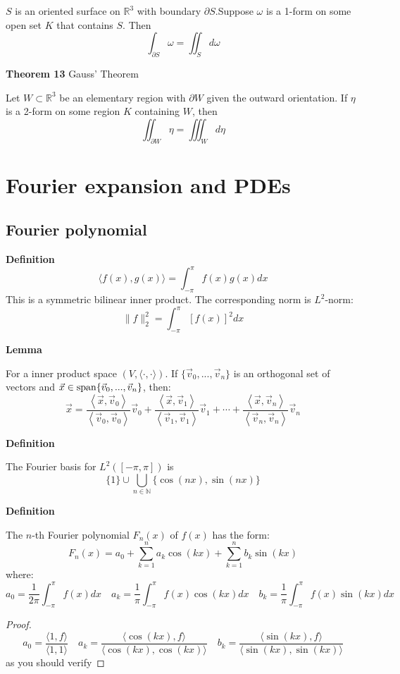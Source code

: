 \documentclass[11pt]{article}
\begin{document}
$S$ is an oriented surface on $\mathbb{R}^3$ with boundary $\partial S$.Suppose $\omega$ is a 1-form on some open set $K$ that contains $S$. Then
$$\int_{\partial S} \omega=\iint_{S} d \omega$$

\textbf{Theorem 13} Gauss' Theorem

Let $W \subset \mathbb{R}^3$ be an elementary region with $\partial W$ given the outward orientation. If $\eta$ is a 2-form on some region $K$ containing $W$, then
$$\iint_{\partial W} \eta=\iiint_{W} d \eta$$

\newpage

\section{Fourier expansion and PDEs}
\subsection{Fourier polynomial}
\textbf{Definition}
$$\langle f(x), g(x)\rangle=\int_{-\pi}^{\pi} f(x) g(x) d x$$
This is a symmetric bilinear inner product. The corresponding norm is $L^2$-norm:
$$\|f\|_{2}^{2}=\int_{-\pi}^{\pi}[f(x)]^{2} d x$$


\textbf{Lemma}

For a inner product space $(V,\langle \cdot,\cdot \rangle)$. If $\{\vec{v}_0,...,\vec{v}_n\}$ is an orthogonal set of vectors and $\vec{x}\in {\rm span}\{\vec{v}_0,...,\vec{v}_n\}$, then:
$$\vec{x}=\frac{\left\langle\vec{x}, \vec{v}_{0}\right\rangle}{\left\langle\vec{v}_{0}, \vec{v}_{0}\right\rangle} \vec{v}_{0}+\frac{\left\langle\vec{x}, \vec{v}_{1}\right\rangle}{\left\langle\vec{v}_{1}, \vec{v}_{1}\right\rangle} \vec{v}_{1}+\cdots+\frac{\left\langle\vec{x}, \vec{v}_{n}\right\rangle}{\left\langle\vec{v}_{n}, \vec{v}_{n}\right\rangle} \vec{v}_{n}$$


\textbf{Definition}

The Fourier basis for $L^2([-\pi,\pi])$ is $$\{1\}\cup \bigcup_{n \in \mathbb{N}}\{\cos (n x), \sin (n x)\}$$

\textbf{Definition}

The $n$-th Fourier polynomial $F_n(x)$ of $f(x)$ has the form:
$$F_{n}(x)=a_{0}+\sum_{k=1}^{n} a_{k} \cos (k x)+\sum_{k=1}^{n} b_{k} \sin (k x)$$
where:
$$a_{0}=\frac{1}{2 \pi} \int_{-\pi}^{\pi} f(x) d x \quad a_{k}=\frac{1}{\pi} \int_{-\pi}^{\pi} f(x) \cos (k x) d x \quad b_{k}=\frac{1}{\pi} \int_{-\pi}^{\pi} f(x) \sin (k x) d x$$

\begin{proof}
    $$
    a_0=\frac{\langle 1,f \rangle}{\langle 1,1\rangle }\quad 
    a_k=\frac{\langle \cos(kx),f \rangle}{\langle\cos(kx),\cos(kx)\rangle}\quad 
    b_k=\frac{\langle \sin(kx),f \rangle}{\langle\sin(kx),\sin(kx)\rangle}
    $$
    as you should verify
\end{proof}
\end{document}
